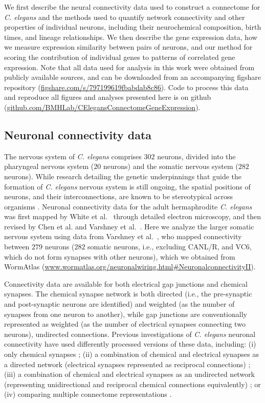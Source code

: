We first describe the neural connectivity data used to construct a connectome for \textit{C. elegans} and the methods used to quantify network connectivity and other properties of individual neurons, including their neurochemical composition, birth times, and lineage relationships.
We then describe the gene expression data, how we measure expression similarity between pairs of neurons, and our method for scoring the contribution of individual genes to patterns of correlated gene expression.
Note that all data used for analysis in this work were obtained from publicly available sources, and can be downloaded from an accompanying figshare repository (\url{figshare.com/s/797199619fbabdab8c86}).
Code to process this data and reproduce all figures and analyses presented here is on github (\url{github.com/BMHLab/CElegansConnectomeGeneExpression}).

\subsection*{Neuronal connectivity data}
The nervous system of \emph{C. elegans} comprises $302$ neurons, divided into the pharyngeal nervous system ($20$ neurons) and the somatic nervous system ($282$ neurons).
While research detailing the genetic underpinnings that guide the formation of \textit{C. elegans} nervous system is still ongoing, the spatial positions of neurons, and their interconnections, are known to be stereotypical across organisms \citep{Riddle1997}.
Neuronal connectivity data for the adult hermaphrodite \emph{C. elegans} was first mapped by White et al.~\citep{White1986} through detailed electron microscopy, and then revised by Chen et al. \citep{Chen2006} and Varshney et al.~\citep{Varshney2011}.
Here we analyze the larger somatic nervous system using data from Varshney et al.~\citep{Varshney2011}, who mapped connectivity between $279$ neurons ($282$ somatic neurons, i.e., excluding CANL/R, and VC6, which do not form synapses with other neurons), which we obtained from WormAtlas \citep{WormAtlas} (\url{www.wormatlas.org/neuronalwiring.html#NeuronalconnectivityII}).

Connectivity data are available for both electrical gap junctions and chemical synapses.
The chemical synapse network is both directed (i.e., the pre-synaptic and post-synaptic neurons are identified) and weighted (as the number of synapses from one neuron to another), while gap junctions are conventionally represented as weighted (as the number of electrical synapses connecting two neurons), undirected connections.
Previous investigations of \emph{C. elegans} neuronal connectivity have used differently processed versions of these data, including:
(i) only chemical synapses \citep{Kashtan2004};
(ii) a combination of chemical and electrical synapses as a directed network (electrical synapses represented as reciprocal connections) \citep{Azulay2016, Kim2016};
(iii) a combination of chemical and electrical synapses as an undirected network (representing unidirectional and reciprocal chemical connections equivalently) \citep{Towlson2013, Kim2014a, Pavlovic2014, Demesmaeker2017};
or (iv) comparing multiple connectome representations \citep{Pan2010}.


